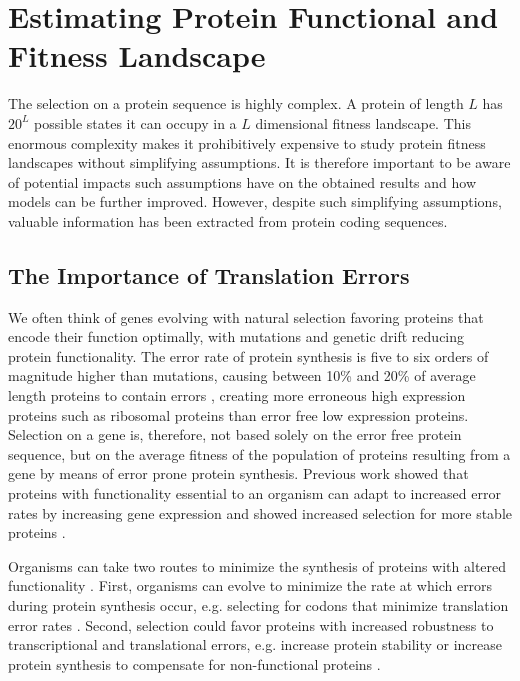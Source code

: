 \section{Estimating Protein Functional and Fitness Landscape}

The selection on a protein sequence is highly complex. 
A protein of length $L$ has $20^L$ possible states it can occupy in a $L$ dimensional fitness landscape.
This enormous complexity makes it prohibitively expensive to study protein fitness landscapes without simplifying assumptions.
It is therefore important to be aware of potential impacts such assumptions have on the obtained results and how models can be further improved.
However, despite such simplifying assumptions, valuable information has been extracted from protein coding sequences.

\subsection{The Importance of Translation Errors}

We often think of genes evolving with natural selection favoring proteins that encode their function optimally, with mutations and genetic drift reducing protein functionality.
The error rate of protein synthesis is five to six orders of magnitude higher than mutations, causing between 10\% and 20\% of average length proteins to contain errors \citep{GoldsmithAndTawfik2009, DrummondAndWilke2009}, creating more erroneous high expression proteins such as ribosomal proteins than error free low expression proteins.
Selection on a gene is, therefore, not based solely on the error free protein sequence, but on the average fitness of the population of proteins resulting from a gene by means of error prone protein synthesis.
Previous work showed that proteins with functionality essential to an organism can adapt to increased error rates by increasing gene expression and showed increased selection for more stable proteins \citep{GoldsmithAndTawfik2009}.

Organisms can take two routes to minimize the synthesis of proteins with altered functionality \citep{DrummondAndWilke2009}.
First, organisms can evolve to minimize the rate at which errors during protein synthesis occur, e.g. selecting for codons that minimize translation error rates \citep{Akashi2003, GilchristAndWagner2006}.
Second, selection could favor proteins with increased robustness to transcriptional and translational errors, e.g. increase protein stability or increase protein synthesis to compensate for non-functional proteins \citep{GoldsmithAndTawfik2009}.

